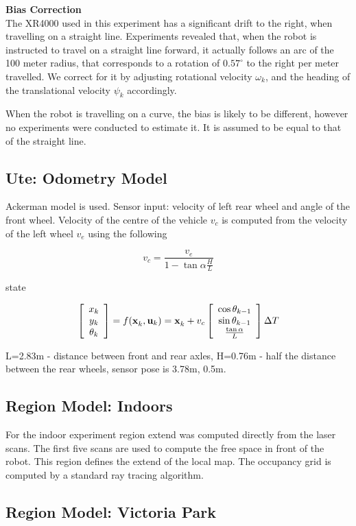 {\bf Bias Correction}\\ The XR4000 used in this experiment has a
significant drift to the right, when travelling on a straight
line. Experiments revealed that, when the robot is instructed to
travel on a straight line forward, it actually follows an arc of the
100 meter radius, that corresponds to a rotation of $0.57^\circ$ to
the right per meter travelled. We correct for it by adjusting
rotational velocity $\omega_k$, and the heading of the translational
velocity $\psi_k$ accordingly.

When the robot is travelling on a curve, the bias is likely to be
different, however no experiments were conducted to estimate it. It is
assumed to be equal to that of the straight line.


\subsection{Ute: Odometry Model}

Ackerman model is used. Sensor input: velocity of left rear wheel and
angle of the front wheel. Velocity of the centre of the vehicle $v_c$
is computed from the velocity of the left wheel $v_e$ using the
following

$$
v_c = \frac{v_e}{1 - \tan \alpha \frac{H}{L}}
$$

state

$$
\Vector{x_k\\y_k\\\theta_k} = f(\x{k}{}{},\U{k}) = 
\x{k}{}{} + v_c \Vector{\cos \theta_{k-1} \\ \sin
  \theta_{k-1} \\ \frac{\tan \alpha}{L}} \Delta T
$$


L=2.83m - distance between front and rear axles, H=0.76m - half the
distance between the rear wheels, sensor pose is 3.78m, 0.5m.

\subsection{Region Model: Indoors}

For the indoor experiment region extend was computed directly from the
laser scans. The first five scans are used to compute the free space in
front of the robot. This region defines the extend of the local map.
The occupancy grid is computed by a standard ray tracing algorithm.

\subsection{Region Model: Victoria Park}

